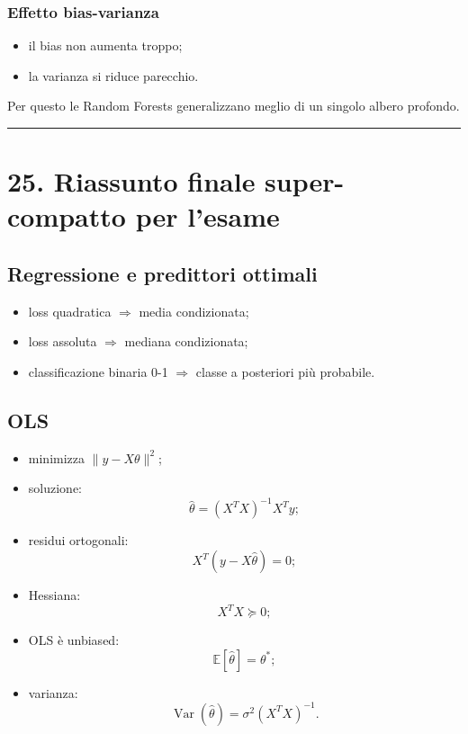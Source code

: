 \documentclass{article}
\providecommand{\tightlist}{%
  \setlength{\itemsep}{0pt}\setlength{\parskip}{0pt}}
\begin{document}
\subsubsection{Effetto bias-varianza}\label{effetto-bias-varianza}

\begin{itemize}
\tightlist
\item
  il bias non aumenta troppo;
\item
  la varianza si riduce parecchio.
\end{itemize}

Per questo le Random Forests generalizzano meglio di un singolo albero
profondo.

\begin{center}\rule{0.5\linewidth}{0.5pt}\end{center}

\section{25. Riassunto finale super-compatto per
l'esame}\label{riassunto-finale-super-compatto-per-lesame}

\subsection{Regressione e predittori
ottimali}\label{regressione-e-predittori-ottimali}

\begin{itemize}
\tightlist
\item
  loss quadratica \(\Rightarrow\) media condizionata;
\item
  loss assoluta \(\Rightarrow\) mediana condizionata;
\item
  classificazione binaria 0-1 \(\Rightarrow\) classe a posteriori più
  probabile.
\end{itemize}

\subsection{OLS}\label{ols}

\begin{itemize}
\tightlist
\item
  minimizza \(\|y-X\theta\|^2\);
\item
  soluzione: \[
  \hat\theta=(X^TX)^{-1}X^Ty;
  \]
\item
  residui ortogonali: \[
  X^T(y-X\hat\theta)=0;
  \]
\item
  Hessiana: \[
  X^TX \succeq 0;
  \]
\item
  OLS è unbiased: \[
  \mathbb{E}[\hat\theta]=\theta^*;
  \]
\item
  varianza: \[
  \operatorname{Var}(\hat\theta)=\sigma^2(X^TX)^{-1}.
  \]
\end{itemize}
\end{document}
